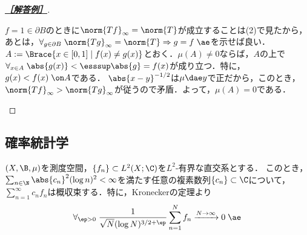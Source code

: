 \documentclass[uplatex,dvipdfmx]{jsarticle}
\begin{document}
\begin{proof}[\textbf{\underline{［解答例］}}]
\begin{enumerate}
        $f=1\in\partial B$のときに$\norm{Tf}_\infty=\norm{T}$が成立することは(2)で見たから，あとは，$\forall_{g\in\partial B}\;\norm{Tg}_\infty=\norm{T}\Rightarrow g=f\;\ae$を示せば良い．
        $A:=\Brace{x\in[0,1]\mid f(x)\ne g(x)}$とおく．$\mu(A)\ne0$ならば，$A$の上で$\forall_{x\in A}\;\abs{g(x)}<\esssup\abs{g}=f(x)$が成り立つ．特に，$g(x)< f(x)\;\on A$である．
        $\abs{x-y}^{-1/2}$は$\mu\dae y$で正だから，このとき，$\norm{Tf}_\infty>\norm{Tg}_\infty$が従うので矛盾．よって，$\mu(A)=0$である．
    \end{enumerate}
\end{proof}

\subsection{確率統計学}

\begin{theorem}
    $(X,\B,\mu)$を測度空間，$\{f_n\}\subset L^2(X;\C)$を$L^2$-有界な直交系とする．
    このとき，$\sum_{n\in\N}\abs{c_n}^2(\log n)^2<\infty$を満たす任意の複素数列$\{c_n\}\subset\C$について，
    $\sum_{n=1}^\infty c_nf_n$は概収束する．特に，Kroneckerの定理より
    \[\forall_{\ep>0}\;\frac{1}{\sqrt{N}(\log N)^{3/2+\ep}}\sum_{n=1}^Nf_n\xrightarrow{N\to\infty}0\;\ae\]
\end{theorem}
\end{document}
